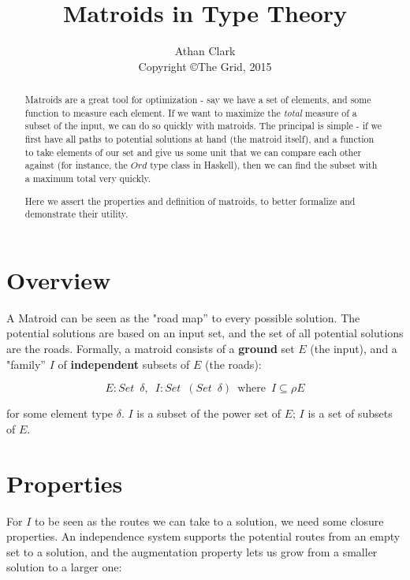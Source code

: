 \documentclass{article}
\newcommand{\where}{\enspace \mathrm{where} \enspace}
\begin{document}
\title{Matroids in Type Theory}
\author{Athan Clark\\ Copyright \copyright \enspace The Grid, 2015}

\maketitle

\begin{abstract}
  Matroids are a great tool for optimization - say we have a set of elements, and
  some function to measure each element. If we want to maximize the \textit{total}
  measure of a subset of the input, we can do so quickly with matroids. The principal
  is simple - if we first have all paths to potential solutions at hand (the matroid itself),
  and a function to take elements of our set and give us some unit that we can compare
  each other against (for instance, the \(Ord\) type class in Haskell), then we can
  find the subset with a maximum total very quickly.

  Here we assert the properties and definition of matroids, to better formalize and
  demonstrate their utility.
\end{abstract}

\section{Overview}

A Matroid can be seen as the "road map'' to every possible solution.
The potential solutions are based on an input set, and the
set of all potential solutions are the roads. Formally, a matroid consists of
a \textbf{ground} set \(E\) (the input), and a "family'' \(I\) of \textbf{independent}
subsets of \(E\) (the roads):

\[
             E : Set \enspace \delta
  , \enspace I : Set \enspace (Set \enspace \delta) \where I \subseteq \rho E
\]

for some element type \(\delta\).
\(I\) is a subset of the power set of \(E\); \(I\) is a set of subsets of \(E\).

\section{Properties}

For \(I\) to be seen as the routes we can take to a solution, we need some closure
properties. An independence system supports the potential routes from an empty set
to a solution, and the augmentation property lets us grow from a smaller solution
to a larger one:
\end{document}
